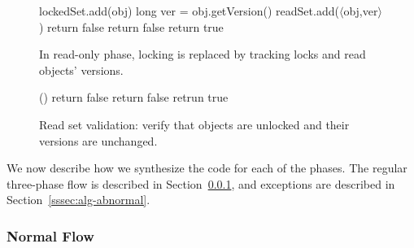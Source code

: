 \begin{figure}
\centering
\begin{minipage}{0.49\textwidth}
\centering
\codesize
\begin{algorithmic}[1]{}
		{\ttfamily
		\State{}lockedSet.add(obj) \label{code:lockedSet:add}
			\State long ver = obj.getVersion() \label{code:track:getVersion}
			\State readSet.add($\langle$obj,ver$\rangle$)
			 \label{code:track:verifyVersion}
				\State return false
			\EndIf
			 \label{code:track:verifyUnlocked}
				\State return false \label{code:track:verifyUnlockedB}
			\EndIf
			\State return true
		\EndFunction
		}
\end{algorithmic}
\caption{In read-only phase, locking is replaced by
tracking locks and read objects' versions.
\label{figure::track}}
\end{minipage}\hfill
\begin{minipage}{0.47\textwidth}
\centering
\codesize
\begin{algorithmic}[1]{}
		{\ttfamily
		()
			\State return false  \label{code:validate:verifyUnlocked}
			\State {}
			\EndIf
				\State return false  \label{code:validate:verifyVersion}
				\State {}
			\EndIf
		\EndFor
		\State retrun true 
		\EndFunction
		}
\end{algorithmic}
\caption{Read set validation: verify that  objects are unlocked and their versions are unchanged.\label{figure::validate}}
\end{minipage}
\end{figure}

We now describe how we synthesize the code for each of the phases. The regular three-phase flow is described in
Section~\ref{sssec:alg-normal}, and exceptions are described in Section~\ref{sssec:alg-abnormal}.

\subsubsection{Normal Flow}
\label{sssec:alg-normal}

